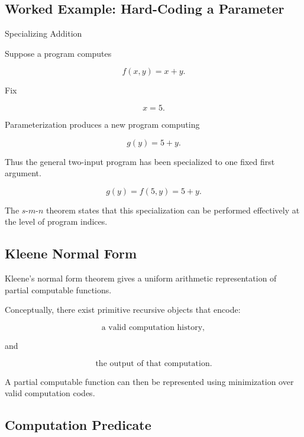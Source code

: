 \subsection{Worked Example: Hard-Coding a Parameter}
\label{subsec:worked-hard-coded-parameter}

\begin{workedexamplebox}{Specializing Addition}

Suppose a program computes

\[
f(x,y)=x+y.
\]

Fix

\[
x=5.
\]

Parameterization produces a new program computing

\[
g(y)=5+y.
\]

Thus the general two-input program has been specialized to one fixed first
argument.

\begin{answerbox}
\[
\boxed{
g(y)=f(5,y)=5+y.
}
\]
\end{answerbox}

The \(s\)-\(m\)-\(n\) theorem states that this specialization can be
performed effectively at the level of program indices.

\end{workedexamplebox}

\subsection{Kleene Normal Form}
\label{subsec:kleene-normal-form}

Kleene's normal form theorem gives a uniform arithmetic representation of
partial computable functions.

Conceptually, there exist primitive recursive objects that encode:

\[
\boxed{
\text{a valid computation history},
}
\]

and

\[
\boxed{
\text{the output of that computation}.
}
\]

A partial computable function can then be represented using minimization
over valid computation codes.

\subsection{Computation Predicate}
\label{subsec:kleene-computation-predicate}

